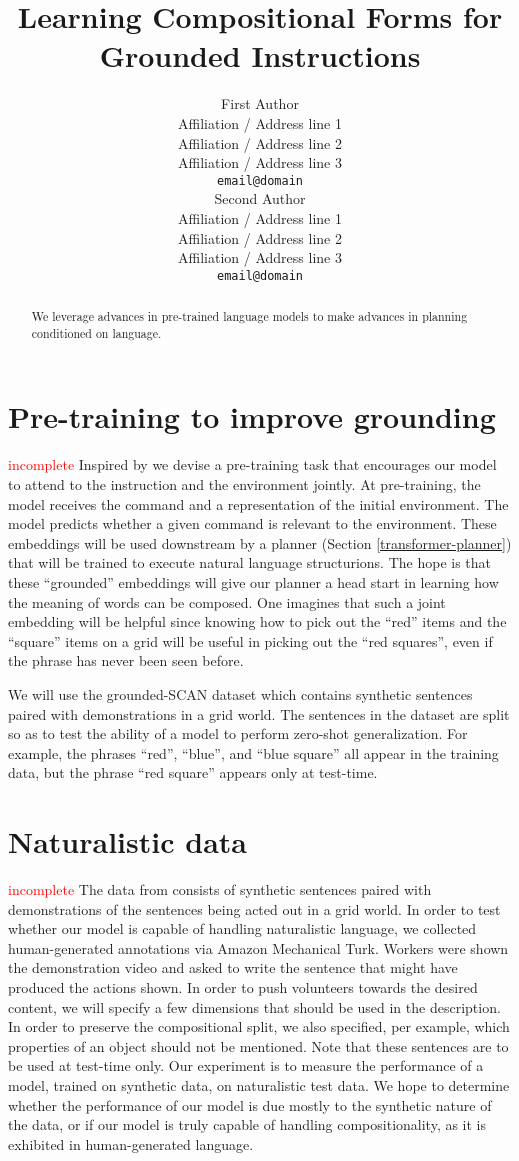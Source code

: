 \documentclass[11pt]{article}
\title{Learning Compositional Forms for Grounded Instructions}
\author{First Author \\
  Affiliation / Address line 1 \\
  Affiliation / Address line 2 \\
  Affiliation / Address line 3 \\
  \texttt{email@domain} \\\And
  Second Author \\
  Affiliation / Address line 1 \\
  Affiliation / Address line 2 \\
  Affiliation / Address line 3 \\
  \texttt{email@domain} \\}
\newcommand\todo[1]{\textcolor{red}{#1}}
\begin{document}
\maketitle
\begin{abstract}
We leverage advances in pre-trained language models to make advances in planning conditioned on language.
\end{abstract}

\section{Pre-training to improve grounding}
\todo{incomplete}
%
Inspired by \cite{Lu2019ViLBERTPT} we devise a pre-training task that encourages our model to attend to the instruction and the environment jointly. 
%
At pre-training, the model receives the command and a representation of the initial environment. 
%
The model predicts whether a given command is relevant to the environment.
%
These embeddings will be used downstream by a planner (Section \ref{transformer-planner}) that will be trained to execute natural language structurions.
%
The hope is that these ``grounded'' embeddings will give our planner a head start in learning how the meaning of words can be composed.
%
One imagines that such a joint embedding will be helpful since knowing how to pick out the ``red'' items and the ``square''  items on a grid will be useful in picking out the ``red squares'', even if the phrase has never been seen before.

We will use the grounded-SCAN dataset \cite{ruis2020benchmark} which contains synthetic sentences paired with demonstrations in a grid world.
%
The sentences in the dataset are split so as to test the ability of a model to perform zero-shot generalization.
%
For example, the phrases ``red'', ``blue'', and ``blue square'' all appear in the training data, but the phrase ``red square'' appears only at test-time.

\section{Naturalistic data}
\todo{incomplete}
%
The data from \citet{ruis2020benchmark} consists of synthetic sentences paired with demonstrations of the sentences being acted out in a grid world.
%
In order to test whether our model is capable of handling naturalistic language, we collected human-generated annotations via Amazon Mechanical Turk.
%
Workers were shown the demonstration video and asked to write the sentence that might have produced the actions shown.
%
In order to push volunteers towards the desired content, we will specify a few dimensions that should be used in the description.
%
In order to preserve the compositional split, we also specified, per example, which properties of an object should not be mentioned.
%
Note that these sentences are to be used at test-time only.
%
Our experiment is to measure the performance of a model, trained on synthetic data, on naturalistic test data.
%
We hope to determine whether the performance of our model is due mostly to the synthetic nature of the data, or if our model is truly capable of handling compositionality, as it is exhibited in human-generated language. 
\end{document}
